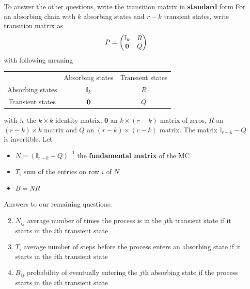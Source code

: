 \documentclass[aspectratio=169]{beamer}
\begin{document}
\begin{frame}
To answer the other questions, write the transition matrix in \textbf{standard} form
\vfill
For an absorbing chain with $k$ absorbing states and $r-k$ transient states, write transition matrix as
\[
P=\begin{pmatrix}
\mathbb{I}_k & R \\
\b0 & Q
\end{pmatrix}
\]
with following meaning
\begin{center}\footnotesize
\begin{tabular}{ccc}
& Absorbing states & Transient states \\
Absorbing states & $\mathbb{I}_k$ & $R$ \\
Transient states & $\b0$ & $Q$
\end{tabular}
\end{center}
with $\mathbb{I}_k$ the $k\times k$ identity matrix, $\mathbf{0}$ an $k\times(r-k)$ matrix of zeros, $R$ an $(r-k)\times k$ matrix and $Q$ an $(r-k)\times(r-k)$ matrix.
The matrix $\mathbb{I}_{r-k}-Q$ is invertible. Let
\begin{itemize}
\item $N=(\mathbb{I}_{r-k}-Q)^{-1}$ the \textbf{fundamental matrix} of the MC
\item $T_i$ sum of the entries on row $i$ of $N$
\item $B=NR$
\end{itemize}
\end{frame}

\begin{frame}
Answers to our remaining questions:
\vfill
\begin{enumerate}
\setcounter{enumi}{1}
\item $N_{ij}$ average number of times the process is in the $j$th transient state if it starts in the $i$th transient state
\vfill
\item $T_i$ average number of steps before the process enters an absorbing state if it starts in the $i$th transient state
\vfill
\item $B_{ij}$ probability of eventually entering the $j$th absorbing state if the process starts in the $i$th transient state
\end{enumerate}
\vfill
\end{frame}
\end{document}
